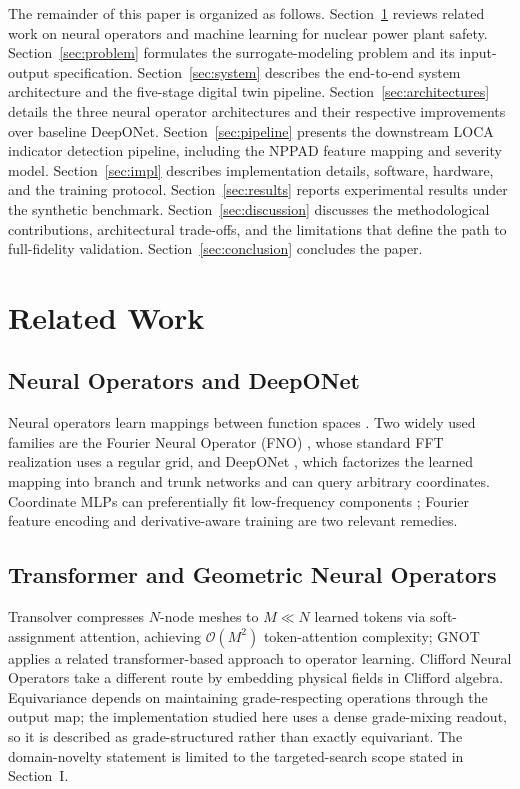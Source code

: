 \documentclass[journal]{IEEEtran}
\newcommand{\added}[1]{#1}
\begin{document}
The remainder of this paper is organized as follows. Section~\ref{sec:related} reviews related work on neural operators and machine learning for nuclear power plant safety. Section~\ref{sec:problem} formulates the surrogate-modeling problem and its input-output specification. Section~\ref{sec:system} describes the end-to-end system architecture and the five-stage digital twin pipeline. Section~\ref{sec:architectures} details the three neural operator architectures and their respective improvements over baseline DeepONet. Section~\ref{sec:pipeline} presents the downstream LOCA indicator detection pipeline, including the NPPAD feature mapping and severity model. Section~\ref{sec:impl} describes implementation details, software, hardware, and the training protocol. Section~\ref{sec:results} reports experimental results under the synthetic benchmark. Section~\ref{sec:discussion} discusses the methodological contributions, architectural trade-offs, and the limitations that define the path to full-fidelity validation. Section~\ref{sec:conclusion} concludes the paper.

\section{Related Work}
\label{sec:related}

\subsection{Neural Operators and DeepONet}
\added{Neural operators learn mappings between function spaces \cite{lu2022comprehensive}. Two widely used families are the Fourier Neural Operator (FNO) \cite{li2021fno}, whose standard FFT realization uses a regular grid, and DeepONet \cite{lu2021deeponet,chen1995}, which factorizes the learned mapping into branch and trunk networks and can query arbitrary coordinates. Coordinate MLPs can preferentially fit low-frequency components \cite{rahaman2019spectral}; Fourier feature encoding \cite{tancik2020ffn} and derivative-aware training \cite{son2021sobolev} are two relevant remedies.}

\subsection{Transformer and Geometric Neural Operators}
Transolver \cite{wu2024transolver} compresses $N$-node meshes to $M \ll N$ learned tokens via soft-assignment attention, achieving $\mathcal{O}(M^2)$ token-attention complexity; GNOT \cite{hao2023gnot} applies a related transformer-based approach to operator learning. Clifford Neural Operators \cite{brandstetter2023clifford} take a different route by embedding physical fields in Clifford algebra.  \added{Equivariance depends on maintaining grade-respecting operations through the output map; the implementation studied here uses a dense grade-mixing readout, so it is described as grade-structured rather than exactly equivariant. The domain-novelty statement is limited to the targeted-search scope stated in Section~I.}
\end{document}
